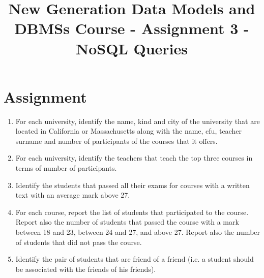 \documentclass[pdflatex,sn-mathphys-num]{sn-jnl}
\begin{document}
\title{New Generation Data Models and DBMSs Course - Assignment 3 - NoSQL Queries}

\author*[1]{ }
\author*[1]{ }
\maketitle

\section{Assignment}
\begin{enumerate}
\item For each university, identify the name, kind and city of the university that are located in California or Massachusetts along with the name, cfu, teacher surname and number of participants of the courses that it offers.
\item For each university, identify the teachers that teach the top three courses in terms of number of participants.
\item Identify the students that passed all their exams for courses with a written text with an average mark above 27.
\item For each course, report the list of students that participated to the course. Report also the number of students that passed the course with a mark between 18 and 23, between 24 and 27, and above 27. Report also the number of students that did not pass the course.
\item Identify the pair of students that are friend of a friend (i.e. a student should be associated with the friends of his friends).
\end{enumerate}
\end{document}
